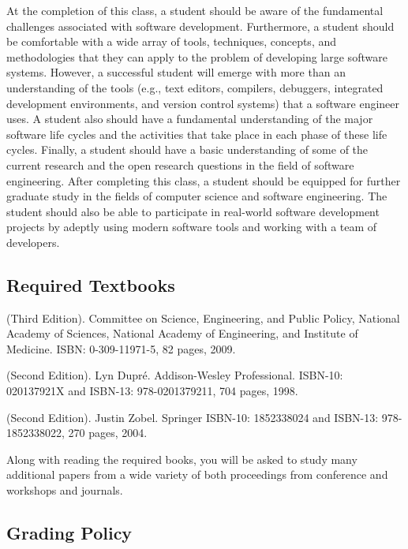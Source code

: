 At the completion of this class, a student should be aware of the fundamental challenges associated with software
development.  Furthermore, a student should be comfortable with a wide array of tools, techniques, concepts, and
methodologies that they can apply to the problem of developing large software systems.  However, a successful student
will emerge with more than an understanding of the tools (e.g., text editors, compilers, debuggers, integrated
development environments, and version control systems) that a software engineer uses.  A student also should have a
fundamental understanding of the major software life cycles and the activities that take place in each phase of these
life cycles.  Finally, a student should have a basic understanding of some of the current research and the open research
questions in the field of software engineering.  After completing this class, a student should be equipped for further
graduate study in the fields of computer science and software engineering.  The student should also be able to
participate in real-world software development projects by adeptly using modern software tools and working with a team of
developers.

\subsection*{Required Textbooks}

 (Third
Edition).  Committee on Science, Engineering, and Public Policy, National 
Academy of Sciences, National Academy of Engineering, and Institute 
of Medicine. ISBN: 0-309-11971-5, 82 pages, 2009.

(Second Edition). Lyn Dupr\'e.  Addison-Wesley Professional.
ISBN-10: 020137921X and ISBN-13: 978-0201379211, 704 pages, 1998.

 (Second Edition).
Justin Zobel.  Springer
ISBN-10: 1852338024 and ISBN-13: 978-1852338022, 270 pages, 2004.

Along with reading the required books, you will be asked to study many
additional papers from a wide variety of both proceedings from
conference and workshops and journals.

\subsection*{Grading Policy}


